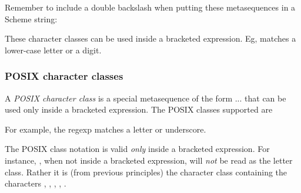 {Remember to include a double backslash when putting
these metasequences in a Scheme string:


These character classes can be used inside
a bracketed expression.  Eg,
 matches a lower-case letter
or a digit.

\subsubsection{POSIX character classes}

A {\em POSIX character class} is a special metasequence
of the form \p{[:}...\p{:]} that can be used only
inside a bracketed expression.  The POSIX classes
supported are

\medskip


\medskip

\n For example, the regexp  
matches a letter or underscore.


The POSIX class notation is valid {\em only} inside a
bracketed expression.  For instance, \p{[:alpha:]},
when not inside a bracketed expression, will {\em not}
be read as the letter class.
Rather it is (from previous principles) the character
class containing the characters \p{:}, , ,
, .

}
